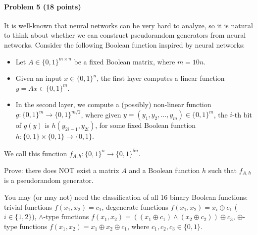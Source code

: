 \paragraph{Problem 5 (18 points)} 
It is well-known that neural networks can be very hard to analyze, so it is natural to think about whether we can construct pseudorandom generators from neural networks. Consider the following Boolean function inspired by neural networks: 
\begin{itemize}[itemsep=0pt]
\item Let $A\in\{0,1\}^{m\times n}$ be a fixed Boolean matrix, where $m=10n$. 
\item Given an input $x\in\{0,1\}^n$, the first layer computes a linear function $y=Ax\in\{0,1\}^m$.
\item In the second layer, we compute a (possibly) non-linear function $g:\{0,1\}^m\to\{0,1\}^{m/2}$, where given $y=(y_1,y_2,\dots,y_{m})\in\{0,1\}^m$, the $i$-th bit of $g(y)$ is $h(y_{2i-1},y_{2i})$, for some fixed Boolean function $h:\{0,1\}\times\{0,1\}\to\{0,1\}$. 
\end{itemize}
We call this function $f_{A,h}:\{0,1\}^n\to\{0,1\}^{5n}$.

Prove: there does NOT exist a matrix $A$ and a Boolean function $h$ such that $f_{A,h}$ is a pseudorandom generator. 

You may (or may not) need the classification of all 16 binary Boolean functions: trivial functions $f(x_1,x_2)=c_1$, degenerate functions $f(x_1,x_2)=x_i\oplus c_1$ ($i\in\{1,2\}$), $\land$-type functions $f(x_1,x_2)=((x_1\oplus c_1)\land(x_2\oplus c_2))\oplus c_3$, $\oplus$-type functions $f(x_1,x_2)=x_1\oplus x_2\oplus c_1$, where $c_1,c_2,c_3\in\{0,1\}$.